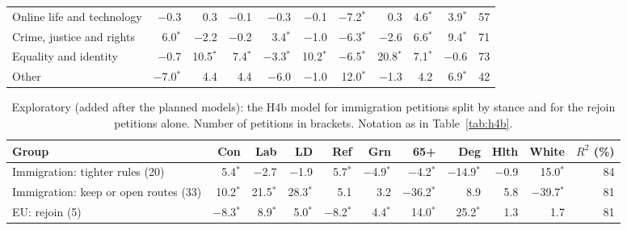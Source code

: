 \documentclass[11pt,a4paper]{article}
\begin{document}
\begin{table}[tbp]
\begin{tabular}{lrrrrrrrrrr}
Online life and technology & $-$0.3 & 0.3 & $-$0.1 & $-$0.3 & $-$0.1 & $-$7.2$^{*}$ & 0.3 & 4.6$^{*}$ & 3.9$^{*}$ & 57\\
Crime, justice and rights & 6.0$^{*}$ & $-$2.2 & $-$0.2 & 3.4$^{*}$ & $-$1.0 & $-$6.3$^{*}$ & $-$2.6 & 6.6$^{*}$ & 9.4$^{*}$ & 71\\
Equality and identity & $-$0.7 & 10.5$^{*}$ & 7.4$^{*}$ & $-$3.3$^{*}$ & 10.2$^{*}$ & $-$6.5$^{*}$ & 20.8$^{*}$ & 7.1$^{*}$ & $-$0.6 & 73\\
Other & $-$7.0$^{*}$ & 4.4 & 4.4 & $-$6.0 & $-$1.0 & 12.0$^{*}$ & $-$1.3 & 4.2 & 6.9$^{*}$ & 42\\
\bottomrule\end{tabular}\end{table}

\begin{table}[tbp]\centering\scriptsize\caption{Exploratory (added after the planned models): the H4b model for immigration petitions split by stance and for the rejoin petitions alone. Number of petitions in brackets. Notation as in Table~\ref{tab:h4b}.}\label{tab:expl}\setlength{\tabcolsep}{3pt}\begin{tabular}{lrrrrrrrrrr}\toprule Group & Con & Lab & LD & Ref & Grn & 65+ & Deg & Hlth & White & $R^2$ (\%)\\\midrule
Immigration: tighter rules (20) & 5.4$^{*}$ & $-$2.7 & $-$1.9 & 5.7$^{*}$ & $-$4.9$^{*}$ & $-$4.2$^{*}$ & $-$14.9$^{*}$ & $-$0.9 & 15.0$^{*}$ & 84\\
Immigration: keep or open routes (33) & 10.2$^{*}$ & 21.5$^{*}$ & 28.3$^{*}$ & 5.1 & 3.2 & $-$36.2$^{*}$ & 8.9 & 5.8 & $-$39.7$^{*}$ & 81\\
EU: rejoin (5) & $-$8.3$^{*}$ & 8.9$^{*}$ & 5.0$^{*}$ & $-$8.2$^{*}$ & 4.4$^{*}$ & 14.0$^{*}$ & 25.2$^{*}$ & 1.3 & 1.7 & 81\\
\bottomrule\end{tabular}\end{table}
\end{document}
